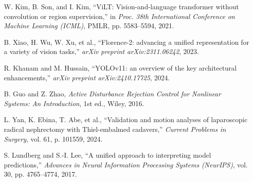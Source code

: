 \documentclass[12pt,a4paper]{report}
\begin{document}
\begin{enumerate}[label={[\arabic*]}, leftmargin=2.5em, itemsep=0.8em]
    \item W. Kim, B. Son, and I. Kim, ``ViLT: Vision-and-language transformer without convolution or region supervision,'' in \textit{Proc. 38th International Conference on Machine Learning (ICML)}, PMLR, pp. 5583--5594, 2021.
    
    \item B. Xiao, H. Wu, W. Xu, et al., ``Florence-2: advancing a unified representation for a variety of vision tasks,'' \textit{arXiv preprint arXiv:2311.06242}, 2023.
    
    \item R. Khanam and M. Hussain, ``YOLOv11: an overview of the key architectural enhancements,'' \textit{arXiv preprint arXiv:2410.17725}, 2024.
    
    \item B. Guo and Z. Zhao, \textit{Active Disturbance Rejection Control for Nonlinear Systems: An Introduction}, 1st ed., Wiley, 2016.
    
    \item L. Yan, K. Ebina, T. Abe, et al., ``Validation and motion analyses of laparoscopic radical nephrectomy with Thiel-embalmed cadavers,'' \textit{Current Problems in Surgery}, vol. 61, p. 101559, 2024.
    
    \item S. Lundberg and S.-I. Lee, ``A unified approach to interpreting model predictions,'' \textit{Advances in Neural Information Processing Systems (NeurIPS)}, vol. 30, pp. 4765--4774, 2017.
\end{enumerate}
\end{document}
